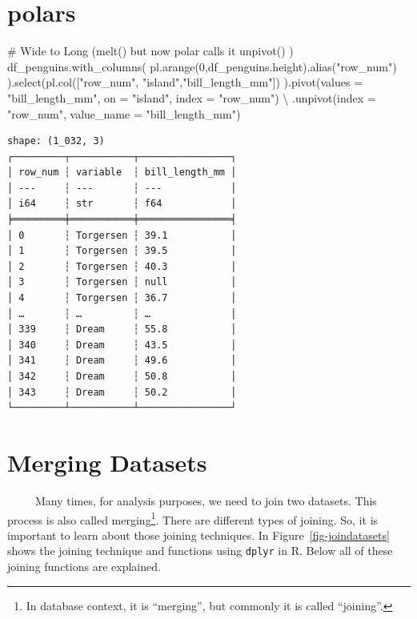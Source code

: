 \documentclass[
  letterpaper,
  DIV=11,
  numbers=noendperiod]{scrreprt}
\newenvironment{Shaded}{\begin{snugshade}}{\end{snugshade}}
\newcommand{\CommentTok}[1]{\textcolor[rgb]{0.37,0.37,0.37}{#1}}
\newcommand{\DecValTok}[1]{\textcolor[rgb]{0.68,0.00,0.00}{#1}}
\newcommand{\NormalTok}[1]{\textcolor[rgb]{0.00,0.23,0.31}{#1}}
\newcommand{\OperatorTok}[1]{\textcolor[rgb]{0.37,0.37,0.37}{#1}}
\newcommand{\StringTok}[1]{\textcolor[rgb]{0.13,0.47,0.30}{#1}}
\begin{document}
\section{polars}

\begin{Shaded}
\begin{Highlighting}[]
\CommentTok{\# Wide to Long (melt() but now polar calls it unpivot() )}
\NormalTok{df\_penguins.with\_columns(}
\NormalTok{    pl.arange(}\DecValTok{0}\NormalTok{,df\_penguins.height).alias(}\StringTok{"row\_num"}\NormalTok{)}
\NormalTok{).select(pl.col([}\StringTok{"row\_num"}\NormalTok{, }\StringTok{"island"}\NormalTok{,}\StringTok{"bill\_length\_mm"}\NormalTok{])}
\NormalTok{).pivot(values }\OperatorTok{=} \StringTok{"bill\_length\_mm"}\NormalTok{, on }\OperatorTok{=} \StringTok{"island"}\NormalTok{, index }\OperatorTok{=} \StringTok{"row\_num"}\NormalTok{) }\OperatorTok{\textbackslash{}}
\NormalTok{    .unpivot(index }\OperatorTok{=} \StringTok{"row\_num"}\NormalTok{, value\_name }\OperatorTok{=} \StringTok{"bill\_length\_mm"}\NormalTok{)}
\end{Highlighting}
\end{Shaded}

\begin{verbatim}
shape: (1_032, 3)
┌─────────┬───────────┬────────────────┐
│ row_num ┆ variable  ┆ bill_length_mm │
│ ---     ┆ ---       ┆ ---            │
│ i64     ┆ str       ┆ f64            │
╞═════════╪═══════════╪════════════════╡
│ 0       ┆ Torgersen ┆ 39.1           │
│ 1       ┆ Torgersen ┆ 39.5           │
│ 2       ┆ Torgersen ┆ 40.3           │
│ 3       ┆ Torgersen ┆ null           │
│ 4       ┆ Torgersen ┆ 36.7           │
│ …       ┆ …         ┆ …              │
│ 339     ┆ Dream     ┆ 55.8           │
│ 340     ┆ Dream     ┆ 43.5           │
│ 341     ┆ Dream     ┆ 49.6           │
│ 342     ┆ Dream     ┆ 50.8           │
│ 343     ┆ Dream     ┆ 50.2           │
└─────────┴───────────┴────────────────┘
\end{verbatim}

\section{Merging Datasets}\label{merging-datasets}

~~~~~Many times, for analysis purposes, we need to join two datasets.
This process is also called merging\footnote{In database context, it is
  ``merging'', but commonly it is called ``joining''.}. There are
different types of joining. So, it is important to learn about those
joining techniques. In Figure~\ref{fig-joindatasets} shows the joining
technique and functions using \texttt{dplyr} in R. Below all of these
joining functions are explained.
\end{document}
